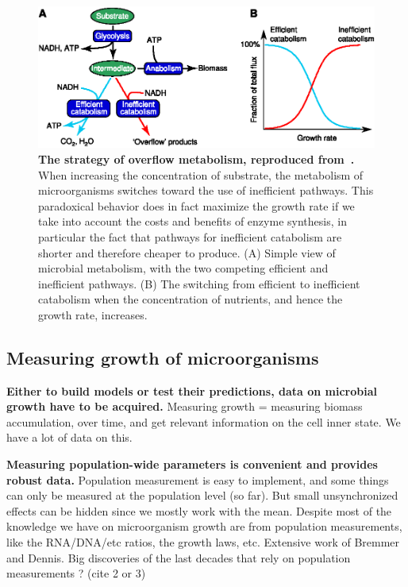 \begin{figure}[tb]
\centering
\includegraphics[width=\textwidth]{./Fig/Chapter1/molenaar_overflow.eps}
\caption{
\textbf{The strategy of overflow metabolism, reproduced from~\cite{molenaar_shifts_2009}.}
When increasing the concentration of substrate, the metabolism of microorganisms switches toward the use of inefficient pathways.
This paradoxical behavior does in fact maximize the growth rate if we take into account the costs and benefits of enzyme synthesis, in particular the fact that pathways for inefficient catabolism are shorter and therefore cheaper to produce.
(A) Simple view of microbial metabolism, with the two competing efficient and inefficient pathways.
(B) The switching from efficient to inefficient catabolism when the concentration of nutrients, and hence the growth rate, increases.
}
\label{fig:molenaar_overflow}
\end{figure}

\subsection{Measuring growth of microorganisms}

\textbf{Either to build models or test their predictions, data on microbial growth have to be acquired.}
Measuring growth = measuring biomass accumulation, over time, and get relevant information on the cell inner state.
We have a lot of data on this.

\textbf{Measuring population-wide parameters is convenient and provides robust data.}
Population measurement is easy to implement, and some things can only be measured at the population level (so far).
But small unsynchronized effects can be hidden since we mostly work with the mean.
Despite most of the knowledge we have on microorganism growth are from population measurements, like the RNA/DNA/etc ratios, the growth laws, etc.
Extensive work of Bremmer and Dennis.
Big discoveries of the last decades that rely on population measurements ? (cite 2 or 3)

